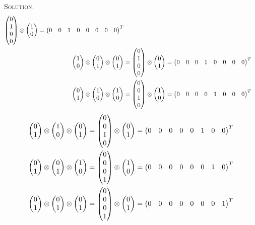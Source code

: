 \documentclass{article}[12pt, a4paper]
\newenvironment{solution}{\par\noindent\textsc{Solution. }}{\\\\\par}
\begin{document}
\begin{solution}
$$\begin{aligned}
\begin{pmatrix}
        0 \\ 1 \\ 0 \\ 0
    \end{pmatrix} \otimes \begin{pmatrix} 1 \\ 0 \end{pmatrix} = \begin{pmatrix}
        0 & 0 & 1 & 0 & 0 & 0 & 0 & 0
    \end{pmatrix}^T \\
    \begin{pmatrix} 1 \\ 0 \end{pmatrix} \otimes \begin{pmatrix} 0 \\ 1 \end{pmatrix} \otimes \begin{pmatrix} 0 \\ 1 \end{pmatrix} &= \begin{pmatrix}
        0 \\ 1 \\ 0 \\ 0
    \end{pmatrix} \otimes \begin{pmatrix} 0 \\ 1 \end{pmatrix} = \begin{pmatrix}
        0 & 0 & 0 & 1 & 0 & 0 & 0 & 0
    \end{pmatrix}^T \\
    \begin{pmatrix} 0 \\ 1 \end{pmatrix} \otimes \begin{pmatrix} 1 \\ 0 \end{pmatrix} \otimes \begin{pmatrix} 1 \\ 0 \end{pmatrix} &= \begin{pmatrix}
        0 \\ 0 \\ 1 \\ 0
    \end{pmatrix} \otimes \begin{pmatrix} 1 \\ 0 \end{pmatrix} = \begin{pmatrix}
        0 & 0 & 0 & 0 & 1 & 0 & 0 & 0
    \end{pmatrix}^T \\
\end{aligned}
$$
$$
\begin{aligned}
    \begin{pmatrix} 0 \\ 1 \end{pmatrix} \otimes \begin{pmatrix} 1 \\ 0 \end{pmatrix} \otimes \begin{pmatrix} 0 \\ 1 \end{pmatrix} &= \begin{pmatrix}
        0 \\ 0 \\ 1 \\ 0
    \end{pmatrix} \otimes \begin{pmatrix} 0 \\ 1 \end{pmatrix} = \begin{pmatrix}
        0 & 0 & 0 & 0 & 0 & 1 & 0 & 0
    \end{pmatrix}^T \\
    \begin{pmatrix} 0 \\ 1 \end{pmatrix} \otimes \begin{pmatrix} 0 \\ 1 \end{pmatrix} \otimes \begin{pmatrix} 1 \\ 0 \end{pmatrix} &= \begin{pmatrix}
        0 \\ 0 \\ 0 \\ 1
    \end{pmatrix} \otimes \begin{pmatrix} 1 \\ 0 \end{pmatrix} = \begin{pmatrix}
        0 & 0 & 0 & 0 & 0 & 0 & 1 & 0
    \end{pmatrix}^T \\
    \begin{pmatrix} 0 \\ 1 \end{pmatrix} \otimes \begin{pmatrix} 0 \\ 1 \end{pmatrix} \otimes \begin{pmatrix} 0 \\ 1 \end{pmatrix} &= \begin{pmatrix}
        0 \\ 0 \\ 0 \\ 1
    \end{pmatrix} \otimes \begin{pmatrix} 0 \\ 1 \end{pmatrix} = \begin{pmatrix}
        0 & 0 & 0 & 0 & 0 & 0 & 0 & 1
    \end{pmatrix}^T
    \end{aligned}
    $$
\end{solution}
\end{document}
